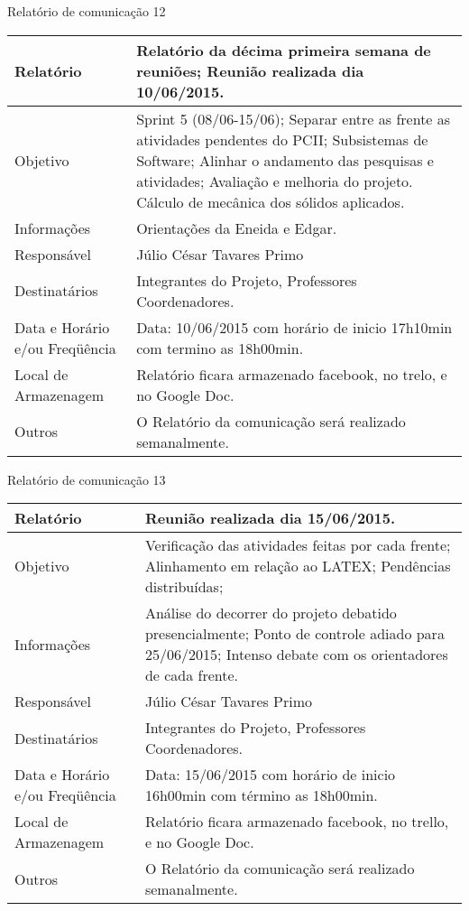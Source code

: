 \begin{center}
{\large Relatório de comunicação 12}
\begin{table}[h]
\begin{tabular}{|p{6cm}|p{9cm}|}\hline
Relatório&Relatório da décima primeira semana de reuniões; Reunião realizada dia 10/06/2015.\\ \hline
Objetivo&Sprint 5 (08/06-15/06);
Separar entre as frente as atividades pendentes do PCII;
Subsistemas de Software;
Alinhar o andamento das pesquisas e atividades;
Avaliação e melhoria do projeto.
Cálculo de mecânica dos sólidos aplicados.\\ \hline
Informações	& Orientações da Eneida e Edgar.\\ \hline
Responsável	& Júlio César Tavares Primo\\ \hline
Destinatários& Integrantes do Projeto, Professores Coordenadores.\\ \hline
Data e Horário e/ou Freqüência&Data: 10/06/2015 com horário de inicio 17h10min com termino as 18h00min.\\ \hline
Local de Armazenagem&Relatório ficara armazenado facebook, no trelo, e no Google Doc.\\ \hline
Outros&O Relatório da comunicação será realizado semanalmente.\\ \hline

\end{tabular}
\end{table}
\FloatBarrier

{\large Relatório de comunicação 13}
\begin{table}[h]
\begin{tabular}{|p{6cm}|p{9cm}|}\hline
Relatório&Reunião realizada dia 15/06/2015.\\ \hline
Objetivo&Verificação das atividades feitas por cada frente;
Alinhamento em relação ao LATEX;
Pendências distribuídas;\\ \hline
Informações&Análise do decorrer do projeto debatido presencialmente;
Ponto de controle adiado para 25/06/2015;
Intenso debate com os orientadores de cada frente.\\ \hline
Responsável	&Júlio César Tavares Primo\\ \hline
Destinatários	&Integrantes do Projeto, Professores Coordenadores.\\ \hline
Data e Horário e/ou Freqüência&Data: 15/06/2015 com horário de inicio 16h00min com término as 18h00min.\\ \hline
Local de Armazenagem&Relatório ficara armazenado facebook, no trello, e no Google Doc.\\ \hline
Outros	&O Relatório da comunicação será realizado semanalmente.\\ \hline

\end{tabular}
\end{table}
\FloatBarrier

\end{center}


% 
